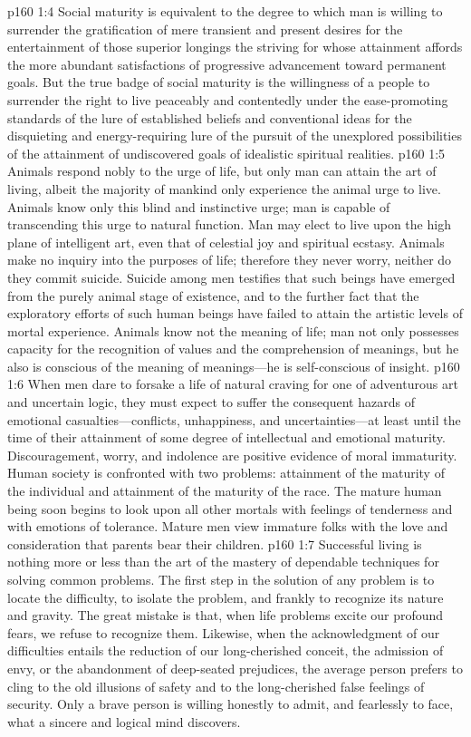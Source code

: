 \vs p160 1:4 Social maturity is equivalent to the degree to which man is willing to surrender the gratification of mere transient and present desires for the entertainment of those superior longings the striving for whose attainment affords the more abundant satisfactions of progressive advancement toward permanent goals. But the true badge of social maturity is the willingness of a people to surrender the right to live peaceably and contentedly under the ease\hyp{}promoting standards of the lure of established beliefs and conventional ideas for the disquieting and energy\hyp{}requiring lure of the pursuit of the unexplored possibilities of the attainment of undiscovered goals of idealistic spiritual realities.
\vs p160 1:5 Animals respond nobly to the urge of life, but only man can attain the art of living, albeit the majority of mankind only experience the animal urge to live. Animals know only this blind and instinctive urge; man is capable of transcending this urge to natural function. Man may elect to live upon the high plane of intelligent art, even that of celestial joy and spiritual ecstasy. Animals make no inquiry into the purposes of life; therefore they never worry, neither do they commit suicide. Suicide among men testifies that such beings have emerged from the purely animal stage of existence, and to the further fact that the exploratory efforts of such human beings have failed to attain the artistic levels of mortal experience. Animals know not the meaning of life; man not only possesses capacity for the recognition of values and the comprehension of meanings, but he also is conscious of the meaning of meanings---he is self\hyp{}conscious of insight.
\vs p160 1:6 When men dare to forsake a life of natural craving for one of adventurous art and uncertain logic, they must expect to suffer the consequent hazards of emotional casualties---conflicts, unhappiness, and uncertainties---at least until the time of their attainment of some degree of intellectual and emotional maturity. Discouragement, worry, and indolence are positive evidence of moral immaturity. Human society is confronted with two problems: attainment of the maturity of the individual and attainment of the maturity of the race. The mature human being soon begins to look upon all other mortals with feelings of tenderness and with emotions of tolerance. Mature men view immature folks with the love and consideration that parents bear their children.
\vs p160 1:7 Successful living is nothing more or less than the art of the mastery of dependable techniques for solving common problems. The first step in the solution of any problem is to locate the difficulty, to isolate the problem, and frankly to recognize its nature and gravity. The great mistake is that, when life problems excite our profound fears, we refuse to recognize them. Likewise, when the acknowledgment of our difficulties entails the reduction of our long\hyp{}cherished conceit, the admission of envy, or the abandonment of deep\hyp{}seated prejudices, the average person prefers to cling to the old illusions of safety and to the long\hyp{}cherished false feelings of security. Only a brave person is willing honestly to admit, and fearlessly to face, what a sincere and logical mind discovers.
